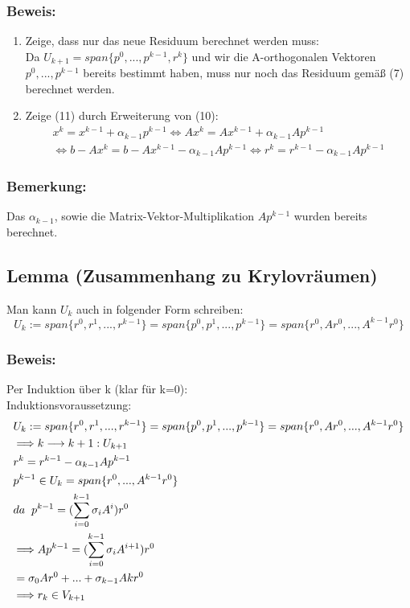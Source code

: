 \documentclass{article}
\begin{document}
\subsubsection{Beweis:}
\begin{enumerate}
\item Zeige, dass nur das neue Residuum berechnet werden muss:
\\Da $U_{k+1} = span\{p^{0},...,p^{k-1},r^{k}\}$ und wir die A-orthogonalen Vektoren $p^{0},...,p^{k-1}$ bereits bestimmt haben, muss nur noch das Residuum gemäß (7) berechnet werden.
\item Zeige (11) durch Erweiterung von (10):
\begin{equation*}
\begin{split}
x^{k} = x^{k-1} + \alpha_{k-1}p^{k-1}
\Longleftrightarrow Ax^{k} = Ax^{k-1} + \alpha_{k-1}Ap^{k-1}\\
\Longleftrightarrow b - Ax^{k} = b - Ax^{k-1} - \alpha_{k-1}Ap^{k-1}
\Longleftrightarrow r^{k} = r^{k-1} - \alpha_{k-1}Ap^{k-1}
\end{split}
\end{equation*}
\end{enumerate}

\subsubsection{Bemerkung:}
Das $\alpha_{k-1}$, sowie die Matrix-Vektor-Multiplikation $Ap^{k-1}$ wurden bereits berechnet.

\subsection{Lemma (Zusammenhang zu Krylovräumen)}
Man kann $U_{k}$ auch in folgender Form schreiben:
\begin{equation}
U_{k} := span\{r^{0}, r^{1},...,r^{k-1}\} = span\{p^{0},p^{1},...,p^{k-1}\} = span\{r^{0}, Ar^{0},...,A^{k-1}r^{0}\}
\end{equation}

\subsubsection{Beweis:}
Per Induktion über k (klar für k=0):
\\Induktionsvoraussetzung:
\begin{align*}
& U_{k} := span\{r^{0}, r^{1},...,r^{k-1}\} = span\{p^{0},p^{1},...,p^{k-1}\} = span\{r^{0}, Ar^{0},...,A^{k-1}r^{0}\}\\
& \Longrightarrow k \longrightarrow k+1: U_{k+1}\\
& r^{k} = r^{k-1} - \alpha_{k-1} Ap^{k-1}\\
& p^{k-1} \in U_{k} = span\{r^{0},...,A^{k-1}r^{0}\}\\
& da \hspace{2mm} p^{k-1} = (\sum_{i=0}^{k-1} \sigma_{i}A^{i})r^{0}\\
& \Longrightarrow Ap^{k-1} = (\sum_{i=0}^{k-1} \sigma_{i}A^{i+1})r^{0}\\
& = \sigma_{0}Ar^{0} + ... + \sigma_{k-1}A{k}r^{0}\\
& \Longrightarrow r_{k} \in V_{k+1}
\end{align*}
\end{document}
